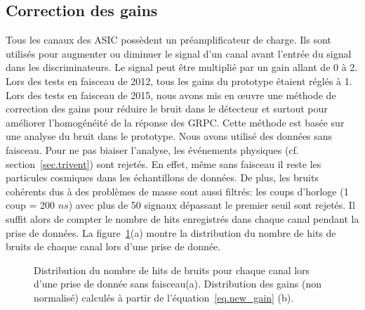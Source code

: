 \subsection{Correction des gains}
\label{sec.gainCorrect}
Tous les canaux des ASIC possèdent un préamplificateur de charge. Ils sont utilisés pour augmenter ou diminuer le signal d'un canal avant l'entrée du signal dans les discriminateurs. Le signal peut être multiplié par un gain allant de 0 à 2. Lors des tests en faisceau de 2012, tous les gains du prototype étaient réglés à 1. Lors des tests en faisceau de 2015, nous avons mis en œuvre une méthode de correction des gains pour réduire le bruit dans le détecteur et surtout pour améliorer l'homogénéité de la réponse des GRPC. Cette méthode est basée sur une analyse du bruit dans le prototype. Nous avons utilisé des données sans faisceau. Pour ne pas biaiser l'analyse, les événements physiques (cf. section~\ref{sec.trivent}) sont rejetés. En effet, même sans faisceau il reste les particules cosmiques dans les échantillons de données. De plus, les bruits cohérents dus à des problèmes de masse sont aussi filtrés: les coups d'horloge (1 coup = 200 $ns$) avec plus de 50 signaux dépassant le premier seuil sont rejetés. Il suffit alors de compter le nombre de hits enregistrés dans chaque canal pendant la prise de données. La figure~\ref{fig:noise_and_gain}(a) montre la distribution du nombre de hits de bruits de chaque canal lors d'une prise de donnée.
\begin{figure}[!ht]
  \caption{Distribution du nombre de hits de bruits pour chaque canal lors d'une prise de donnée sans faisceau(a). Distribution des gains (non normalisé) calculés à partir de l'équation~\ref{eq.new_gain} (b).\label{fig:noise_and_gain}}
\end{figure}
